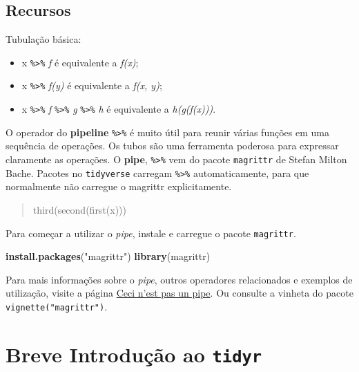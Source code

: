 \documentclass[]{book}
\newenvironment{Shaded}{\begin{snugshade}}{\end{snugshade}}
\newcommand{\KeywordTok}[1]{\textcolor[rgb]{0.13,0.29,0.53}{\textbf{#1}}}
\newcommand{\NormalTok}[1]{#1}
\newcommand{\StringTok}[1]{\textcolor[rgb]{0.31,0.60,0.02}{#1}}
\providecommand{\tightlist}{%
  \setlength{\itemsep}{0pt}\setlength{\parskip}{0pt}}
\begin{document}
\hypertarget{recursos}{%
\subsection{Recursos}\label{recursos}}

Tubulação básica:

\begin{itemize}
\tightlist
\item
  x \texttt{\%\textgreater{}\%} \emph{f} é equivalente a \emph{f(x)};
\item
  x \texttt{\%\textgreater{}\%} \emph{f(y)} é equivalente a \emph{f(x, y)};
\item
  x \texttt{\%\textgreater{}\%} \emph{f} \texttt{\%\textgreater{}\%} \emph{g} \texttt{\%\textgreater{}\%} \emph{h} é equivalente a \emph{h(g(f(x)))}.
\end{itemize}

O operador do \textbf{pipeline} \texttt{\%\textgreater{}\%} é muito útil para reunir várias funções em uma sequência de operações. Os tubos são uma ferramenta poderosa para expressar claramente as operações. O \textbf{pipe}, \texttt{\%\textgreater{}\%} vem do pacote \texttt{magrittr} de Stefan Milton Bache. Pacotes no \texttt{tidyverse} carregam \texttt{\%\textgreater{}\%} automaticamente, para que normalmente não carregue o magrittr explicitamente.

\begin{quote}
third(second(first(x)))
\end{quote}

Para começar a utilizar o \emph{pipe}, instale e carregue o pacote \texttt{magrittr}.

\begin{Shaded}
\begin{Highlighting}[]
\KeywordTok{install.packages}\NormalTok{(}\StringTok{"magrittr"}\NormalTok{)}
\KeywordTok{library}\NormalTok{(magrittr)}
\end{Highlighting}
\end{Shaded}

Para mais informações sobre o \emph{pipe}, outros operadores relacionados e exemplos de utilização, visite a página \href{https://cran.r-project.org/web/packages/magrittr/vignettes/magrittr.html}{Ceci n'est pas un pipe}. Ou consulte a vinheta do pacote \texttt{vignette("magrittr")}.

\hypertarget{breve-introducao-ao-tidyr}{%
\section{\texorpdfstring{Breve Introdução ao \texttt{tidyr}}{Breve Introdução ao tidyr}}\label{breve-introducao-ao-tidyr}}
\end{document}
